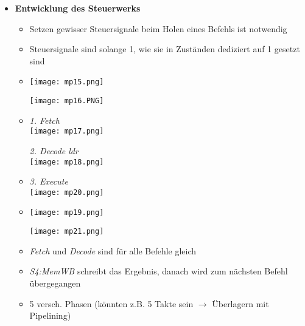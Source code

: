 \begin{itemize}
        \item \textbf{Entwicklung des Steuerwerks}
            \begin{itemize}
                \item Setzen gewisser Steuersignale beim Holen eines Befehls ist notwendig
                \item Steuersignale sind solange 1, wie sie in Zuständen dediziert auf 1 gesetzt sind
                \item[]
                    \begin{minipage}{0.5\textwidth}
                        \texttt{[image: mp15.png]}
                    \end{minipage}
                    \begin{minipage}{0.3\textwidth}
                        \texttt{[image: mp16.PNG]}
                    \end{minipage}
                \item[]
                    \begin{minipage}{0.45\textwidth}
                        \textit{1. Fetch} \\
                        \texttt{[image: mp17.png]}
                    \end{minipage}
                    \begin{minipage}{0.45\textwidth}
                        \textit{2. Decode ldr} \\
                        \texttt{[image: mp18.png]}
                    \end{minipage}
                \item[]
                    \begin{minipage}{0.45\textwidth}
                        \textit{3. Execute} \\
                        \texttt{[image: mp20.png]}
                    \end{minipage}
                \item[]
                    \begin{minipage}{0.4\textwidth}
                        \texttt{[image: mp19.png]}
                    \end{minipage}
                    \begin{minipage}{0.5\textwidth}
                        \texttt{[image: mp21.png]}
                    \end{minipage}
                \item \textit{Fetch} und \textit{Decode} sind für alle Befehle gleich
                \item \textit{S4:MemWB} schreibt das Ergebnis, danach wird zum nächsten Befehl übergegangen
                \item 5 versch. Phasen (könnten z.B. 5 Takte sein $\rightarrow$ Überlagern mit Pipelining)
            \end{itemize}


\end{itemize}
